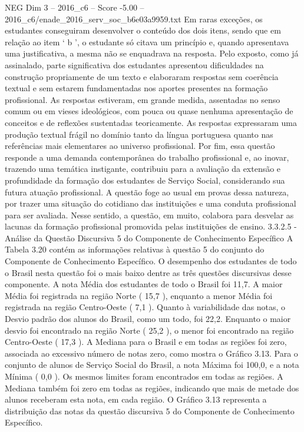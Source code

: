 \begin{textsample}{NEG Dim 3 – 2016\_c6 – Score -5.00 – 2016\_c6/enade\_2016\_serv\_soc\_b6e03a9959.txt}
Em raras exceções, os estudantes conseguiram desenvolver o conteúdo dos dois itens, sendo que em relação ao item ‘ b ’, o estudante só citava um princípio e, quando apresentava uma justificativa, a mesma não se enquadrava na resposta.
Pelo exposto, como já assinalado, parte significativa dos estudantes apresentou dificuldades na construção propriamente de um texto e elaboraram respostas sem coerência textual e sem estarem fundamentadas nos aportes presentes na formação profissional.
As respostas estiveram, em grande medida, assentadas no senso comum ou em vieses ideológicos, com pouca ou quase nenhuma apresentação de conceitos e de reflexões sustentadas teoricamente.
As respostas expressaram uma produção textual frágil no domínio tanto da língua portuguesa quanto nas referências mais elementares ao universo profissional.
Por fim, essa questão responde a uma demanda contemporânea do trabalho profissional e, ao inovar, trazendo uma temática instigante, contribuiu para a avaliação da extensão e profundidade da formação dos estudantes de Serviço Social, considerando sua futura atuação profissional.
A questão foge ao usual em provas dessa natureza, por trazer uma situação do cotidiano das instituições e uma conduta profissional para ser avaliada.
Nesse sentido, a questão, em muito, colabora para desvelar as lacunas da formação profissional promovida pelas instituições de ensino. 3.3.2.5 - Análise da Questão Discursiva 5 do Componente de Conhecimento Específico A Tabela 3.20 contém as informações relativas à questão 5 do conjunto do Componente de Conhecimento Específico.
O desempenho dos estudantes de todo o Brasil nesta questão foi o mais baixo dentre as três questões discursivas desse componente.
A nota Média dos estudantes de todo o Brasil foi 11,7.
A maior Média foi registrada na região Norte ( 15,7 ), enquanto a menor Média foi registrada na região Centro-Oeste ( 7,1 ).
Quanto à variabilidade das notas, o Desvio padrão dos alunos do Brasil, como um todo, foi 22,2.
Enquanto o maior desvio foi encontrado na região Norte ( 25,2 ), o menor foi encontrado na região Centro-Oeste ( 17,3 ).
A Mediana para o Brasil e em todas as regiões foi zero, associada ao excessivo número de notas zero, como mostra o Gráfico 3.13.
Para o conjunto de alunos de Serviço Social do Brasil, a nota Máxima foi 100,0, e a nota Mínima ( 0,0 ).
Os mesmos limites foram encontrados em todas as regiões.
A Mediana também foi zero em todas as regiões, indicando que mais de metade dos alunos receberam esta nota, em cada região.
O Gráfico 3.13 representa a distribuição das notas da questão discursiva 5 do Componente de Conhecimento Específico.

\end{textsample}
